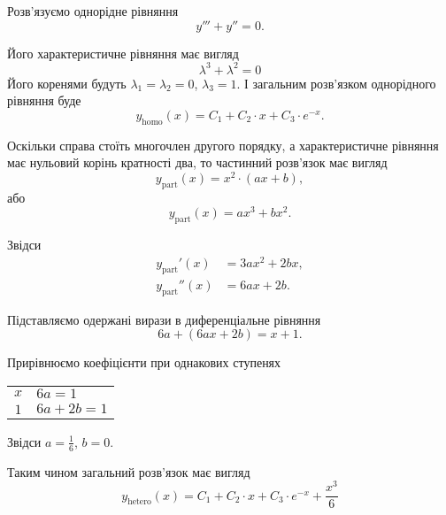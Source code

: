 \begin{solution}
	Розв'язуємо однорідне рівняння
	\begin{equation*}
		y''' + y'' = 0.
	\end{equation*}

	Його характеристичне рівняння має вигляд
	\begin{equation*}
		\lambda^3 + \lambda^2 = 0
	\end{equation*}
	Його коренями будуть $\lambda_1 = \lambda_2 = 0$, $\lambda_3 = 1$. І загальним роз\-в'яз\-ком однорідного рівняння буде
	\begin{equation*}
		y_{\text{homo}}(x) = C_1 + C_2 \cdot x + C_3 \cdot e^{-x}.
	\end{equation*}

	Оскільки справа стоїть многочлен другого порядку, а характеристичне рівняння має нульовий корінь кратності два, то частинний розв'язок має вигляд 
	\begin{equation*}
		y_{\text{part}}(x) = x^2 \cdot (a x + b),
	\end{equation*}
	або
	\begin{equation*}
		y_{\text{part}}(x) = a x^3 + b x^2.
	\end{equation*}

	Звідси
	\begin{align*}
		y_{\text{part}}'(x) &= 3 a x^2 + 2 b x, \\
		y_{\text{part}}''(x) &= 6 a x + 2 b.
	\end{align*}

	Підставляємо одержані вирази в диференціальне рівняння
	\begin{equation*}
		6 a + (6 a x + 2 b) = x + 1.
	\end{equation*}

	Прирівнюємо коефіцієнти при однакових ступенях
	\begin{table}[H]
		\centering
		\begin{tabular}{c|l}
			$x$ & $6 a = 1$ \\
			$1$ & $6 a + 2 b = 1$
		\end{tabular}
	\end{table}

	Звідси $a = \frac16$, $b = 0$. \parvskip

	Таким чином загальний розв'язок має вигляд
	\begin{equation*}
		y_{\text{hetero}}(x) = C_1 + C_2 \cdot x + C_3 \cdot e^{-x} + \frac{x^3}{6}
	\end{equation*}
\end{solution}

